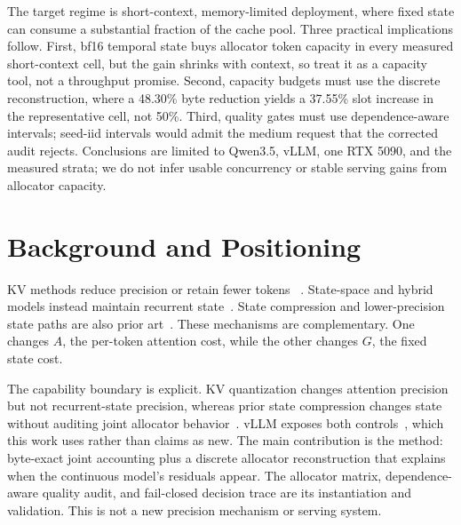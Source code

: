\documentclass[conference,letterpaper,10pt]{IEEEtran}
\begin{document}
The target regime is short-context, memory-limited deployment, where fixed
state can consume a substantial fraction of the cache pool. Three practical
implications follow. First, bf16 temporal state buys allocator token capacity
in every measured short-context cell, but the gain shrinks with context, so
treat it as a capacity tool, not a throughput promise. Second, capacity
budgets must use the discrete reconstruction, where a 48.30\% byte reduction
yields a 37.55\% slot increase in the representative cell, not 50\%. Third,
quality gates must use dependence-aware intervals; seed-iid intervals would
admit the medium request that the corrected audit rejects. Conclusions are
limited to Qwen3.5, vLLM, one RTX 5090, and the measured strata; we do not
infer usable concurrency or stable serving gains from allocator capacity.

\section{Background and Positioning}
\label{sec:related}

KV methods reduce precision or retain fewer tokens
~\cite{kivi,kvquant,minikv,h2o,streamingllm,snapkv}. State-space and hybrid
models instead maintain recurrent state~\cite{mamba,mamba2,jamba,
recurrentgemma,zamba}. State compression and lower-precision state paths are
also prior art~\cite{replayssm,vllmpr22196,vllmpr43518}. These mechanisms are
complementary. One changes $A$, the per-token attention cost, while the other
changes $G$, the fixed state cost.

The capability boundary is explicit. KV quantization changes attention
precision but not recurrent-state precision, whereas prior state compression
changes state without auditing joint allocator behavior~\cite{kivi,kvquant,
replayssm}. vLLM exposes both controls~\cite{vllm,vllmpr22196}, which this work
uses rather than claims as new. The main contribution is the method: byte-exact
joint accounting plus a discrete allocator reconstruction that explains when
the continuous model's residuals appear. The allocator matrix,
dependence-aware quality audit, and fail-closed decision trace are its
instantiation and validation. This is not a new precision mechanism or serving
system.
\end{document}

